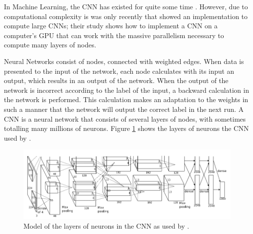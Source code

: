 In Machine Learning, the CNN has existed for quite some time \citep{fukushima1980neocognition}.
However, due to computational complexity is was only recently that \citet{krizhevsky2012imagenet} showed an implementation to compute large CNNs;
their study shows how to implement a CNN on a computer's GPU that can work with the massive parallelism necessary to compute many layers of nodes.

Neural Networks consist of nodes, connected with weighted edges.
When data is presented to the input of the network, each node calculates with its input an output, which results in an output of the network.
When the output of the network is incorrect according to the label of the input, a backward calculation in the network is performed.
This calculation makes an adaptation to the weights in such a manner that the network will output the correct label in the next run.
A CNN is a neural network that consists of several layers of nodes, with sometimes totalling many millions of neurons.
Figure \ref{fig:cnn-alex} shows the layers of neurons the CNN used by \citet{krizhevsky2012imagenet}.

\begin{figure}%
\centering
\ifx\showfig\undefined
\includegraphics[keepaspectratio=true,width=\textwidth]{images/alexnet2012.png} \fi
\caption{Model of the layers of neurons in the CNN as used by \citet{krizhevsky2012imagenet}.}
\label{fig:cnn-alex}
\end{figure}

